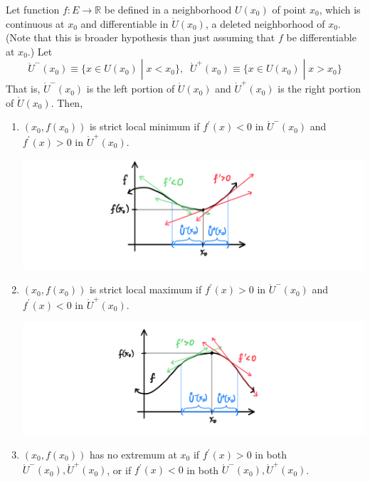 \documentclass{article}
\begin{document}
    \begin{theorem}
    Let function $f: E \longrightarrow \mathbb{R}$ be defined in a neighborhood $U(x_0)$ of point $x_0$, which is continuous at $x_0$ and differentiable in $\mathring{U}(x_0)$, a deleted neighborhood of $x_0$. (Note that this is broader hypothesis than just assuming that $f$ be differentiable at $x_0$.) Let
    \[\mathring{U}^- (x_0) \equiv \{x \in U(x_0) \;|\; x < x_0\}, \;\; \mathring{U}^+ (x_0) \equiv \{x \in U(x_0) \;|\; x > x_0\}\]
    That is, $\mathring{U}^- (x_0)$ is the left portion of $\mathring{U}(x_0)$ and $\mathring{U}^+ (x_0)$ is the right portion of $\mathring{U}(x_0)$. Then, 
    \begin{enumerate}
      \item $(x_0, f(x_0))$ is strict local minimum if $f^\prime(x) < 0$ in $\mathring{U}^- (x_0)$ and $f^\prime (x) > 0$ in $\mathring{U}^+ (x_0)$. 
      \begin{center}
          \includegraphics[scale=0.25]{img/Strict_Local_minimum.PNG}
      \end{center}
      \item $(x_0, f(x_0))$ is strict local maximum if $f^\prime(x) > 0$ in $\mathring{U}^- (x_0)$ and $f^\prime (x) < 0$ in $\mathring{U}^+ (x_0)$. 
      \begin{center}
          \includegraphics[scale=0.25]{img/Strict_Local_Maximum.PNG}
      \end{center}
      \item $(x_0, f(x_0))$ has no extremum at $x_0$ if $f^\prime (x) > 0$ in both $\mathring{U}^- (x_0), \mathring{U}^+ (x_0)$, or if $f^\prime(x)< 0$ in both $\mathring{U}^- (x_0), \mathring{U}^+ (x_0)$. 

\end{enumerate}
\end{theorem}
\end{document}
